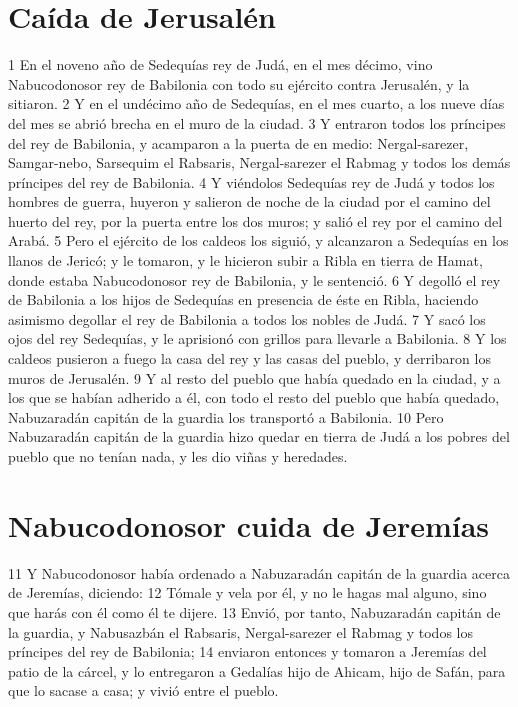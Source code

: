 \section*{Caída de Jerusalén}

1 En el noveno año de Sedequías rey de Judá, en el mes décimo, vino Nabucodonosor rey de Babilonia con todo su ejército contra Jerusalén, y la sitiaron.
2 Y en el undécimo año de Sedequías, en el mes cuarto, a los nueve días del mes se abrió brecha en el muro de la ciudad.
3 Y entraron todos los príncipes del rey de Babilonia, y acamparon a la puerta de en medio: Nergal-sarezer, Samgar-nebo, Sarsequim el Rabsaris, Nergal-sarezer el Rabmag y todos los demás príncipes del rey de Babilonia.
4 Y viéndolos Sedequías rey de Judá y todos los hombres de guerra, huyeron y salieron de noche de la ciudad por el camino del huerto del rey, por la puerta entre los dos muros; y salió el rey por el camino del Arabá.
5 Pero el ejército de los caldeos los siguió, y alcanzaron a Sedequías en los llanos de Jericó; y le tomaron, y le hicieron subir a Ribla en tierra de Hamat, donde estaba Nabucodonosor rey de Babilonia, y le sentenció.
6 Y degolló el rey de Babilonia a los hijos de Sedequías en presencia de éste en Ribla, haciendo asimismo degollar el rey de Babilonia a todos los nobles de Judá.
7 Y sacó los ojos del rey Sedequías, y le aprisionó con grillos para llevarle a Babilonia.
8 Y los caldeos pusieron a fuego la casa del rey y las casas del pueblo, y derribaron los muros de Jerusalén.
9 Y al resto del pueblo que había quedado en la ciudad, y a los que se habían adherido a él, con todo el resto del pueblo que había quedado, Nabuzaradán capitán de la guardia los transportó a Babilonia.
10 Pero Nabuzaradán capitán de la guardia hizo quedar en tierra de Judá a los pobres del pueblo que no tenían nada, y les dio viñas y heredades.

\section*{Nabucodonosor cuida de Jeremías}

11 Y Nabucodonosor había ordenado a Nabuzaradán capitán de la guardia acerca de Jeremías, diciendo:
12 Tómale y vela por él, y no le hagas mal alguno, sino que harás con él como él te dijere.
13 Envió, por tanto, Nabuzaradán capitán de la guardia, y Nabusazbán el Rabsaris, Nergal-sarezer el Rabmag y todos los príncipes del rey de Babilonia;
14 enviaron entonces y tomaron a Jeremías del patio de la cárcel, y lo entregaron a Gedalías hijo de Ahicam, hijo de Safán, para que lo sacase a casa; y vivió entre el pueblo.

